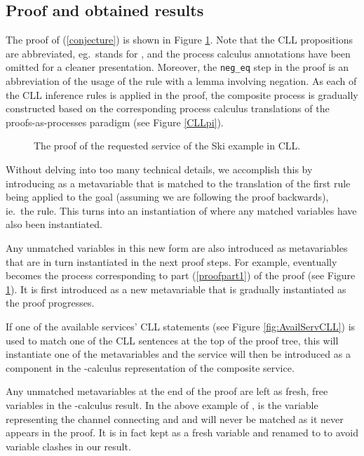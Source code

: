 \documentclass[copyright,creativecommons]{eptcs}
\begin{document}
\subsection{Proof and obtained results}
\label{resres}

The proof of (\ref{conjecture}) is shown in Figure \ref{fig:SProof2}. Note that the CLL propositions are abbreviated, eg.\  stands for , and the process calculus annotations have been omitted for a cleaner presentation. Moreover, the \texttt{neg\_eq} step in the proof is an abbreviation of the usage of the  rule with a lemma involving negation. As each of the CLL inference rules is applied in the proof, the composite process  is gradually constructed based on the corresponding process calculus translations of the proofs-as-processes paradigm (see Figure \ref{CLLpi}). 


\begin{figure}[htbp]
	\centering
	\scriptsize
	
	\medskip
	\medskip
	
	\normalsize
	\caption{The proof of the requested service of the Ski example in CLL.}
	\label{fig:SProof2}
\end{figure}


Without delving into too many technical details, we accomplish this by introducing  as a metavariable that is matched to the translation of the first rule being applied to the goal (assuming we are following the proof backwards), ie.\ the  rule. This turns  into an instantiation of  where any matched variables have also been instantiated. 

Any unmatched variables in this new form are also introduced as metavariables that are in turn instantiated in the next proof steps. For example,  eventually becomes the process corresponding to part (\ref{proofpart1}) of the proof (see Figure \ref{fig:SProof2}). It is first introduced as a new metavariable that is gradually instantiated as the proof progresses. 

If one of the available services' CLL statements (see Figure \ref{fig:AvailServCLL}) is used to match one of the CLL sentences at the top of the proof tree, this will instantiate one of the metavariables and the service will then be introduced as a component in the -calculus representation of the composite service.

Any unmatched metavariables at the end of the proof are left as fresh, free variables in the -calculus result. In the above example of ,  is the variable representing the channel connecting  and  and will never be matched as it never appears in the proof. It is in fact kept as a fresh variable and renamed to  to avoid variable clashes in our result.
\end{document}
